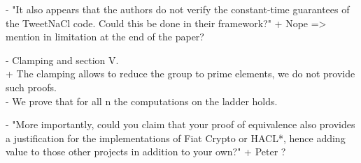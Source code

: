 {- "It also appears that the authors do not verify the constant-time
guarantees of the TweetNaCl code. Could this be done in their
framework?"
+ Nope => mention in limitation at the end of the paper?

- Clamping and section V.\\
+ The clamping allows to reduce the group to prime elements, we do not provide
such proofs.\\
- We prove that for all n the computations on the ladder holds.

- "More importantly, could you claim that your proof of equivalence also provides
a justification for the implementations of Fiat Crypto or HACL*, hence adding
value to those other projects in addition to your own?"
+ Peter ?
}

\newpage
{}%
